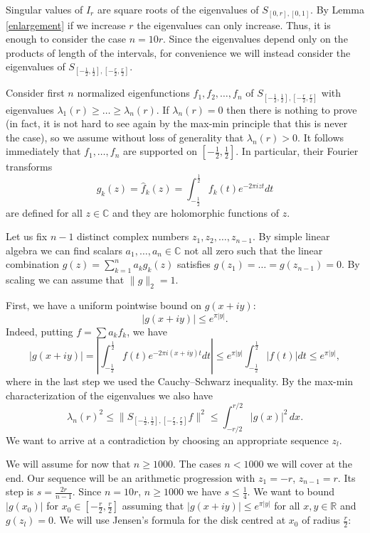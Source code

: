 \documentclass[12pt]{amsart}
\numberwithin{equation}{section}
\newcommand{\R}{\mathbb{R}}
\newcommand{\Cm}{\mathbb{C}}
\newcommand{\abs}[1]{| #1 |}
\begin{document}
Singular values of $I_r$ are square roots of the eigenvalues of $S_{[0,r], [0,1]}$. By Lemma \ref{enlargement} if we increase $r$ the eigenvalues can only increase. Thus, it is enough to consider the case $n = 10r$. Since the eigenvalues depend only on the products of length of the intervals, for convenience we will instead consider the eigenvalues of $S_{[-\frac{1}{2},\frac{1}{2}],[-\frac{r}{2},\frac{r}{2}]}$.

Consider first $n$ normalized eigenfunctions $f_1, f_2, \ldots , f_n$ of $S_{[-\frac{1}{2},\frac{1}{2}],[-\frac{r}{2},\frac{r}{2}]}$ with eigenvalues $\lambda_1(r)\geq \dots \geq \lambda_n(r)$. If $\lambda_n(r) = 0$ then there is nothing to prove (in fact, it is not hard to see again by the max-min principle that this is never the case), so we assume without loss of generality that $\lambda_n(r)>0$. It follows immediately that $f_1,\dots, f_n$ are supported on $[-\frac{1}{2},\frac{1}{2}]$. In particular, their Fourier transforms
$$g_k(z) = \hat{f}_k(z) =\int_{-\frac{1}{2}}^\frac{1}{2} f_k(t)e^{-2\pi i zt}dt$$
are defined for all $z\in\Cm$ and they are holomorphic functions of $z$. 

Let us fix $n-1$ distinct complex numbers $z_1, z_2, \ldots , z_{n-1}$. By simple linear algebra we can find scalars $a_1,\dots, a_n \in \mathbb{C}$ not all zero such that the linear combination $g(z) = \sum_{k=1}^n a_kg_k(z)$ satisfies $g(z_1) = \dots = g(z_{n-1}) = 0$. By scaling we can assume that $\|g\|_2 = 1$.

First, we have a uniform pointwise bound on $g(x+iy)$:
\begin{equation}\label{g uniform bound}
|g(x+iy)| \le e^{\pi |y|}.
\end{equation}
Indeed, putting $f = \sum a_k f_k$, we have
$$|g(x+iy)| = \left|\int_{-\frac{1}{2}}^\frac{1}{2} f(t)e^{-2\pi i (x+iy)t}dt\right| \le e^{\pi |y|}\int_{-\frac{1}{2}}^\frac{1}{2} |f(t)|dt \le e^{\pi |y|},$$
where in the last step we used the Cauchy--Schwarz inequality. By the max-min characterization of the eigenvalues we also have 
\begin{equation}\label{g lower bound}
\lambda_n(r)^2 \leq \|S_{[-\frac{1}{2},\frac{1}{2}],[-\frac{r}{2},\frac{r}{2}]} f\|^2 \leq \int_{-r/2}^{r/2} \abs{g(x)}^2 \, dx.
\end{equation}
We want to arrive at a contradiction by choosing an appropriate sequence $z_l$.

We will assume for now that $n\ge 1000$. The cases $n < 1000$ we will cover at the end. Our sequence will be an arithmetic progression with $z_1 = -r$, $z_{n-1} = r$. Its step is $s=\frac{2r}{n-1}$. Since $n = 10r$, $n\ge 1000$ we have $s \le \frac{1}{4}$. We want to bound $|g(x_0)|$ for $x_0\in [-\frac{r}{2},\frac{r}{2}]$ assuming that $|g(x+iy)|\le e^{\pi |y|}$ for all $x, y\in \R$ and $g(z_l) = 0$. We will use Jensen's formula for the disk centred at $x_0$ of radius $\frac{r}{2}$:
\end{document}
